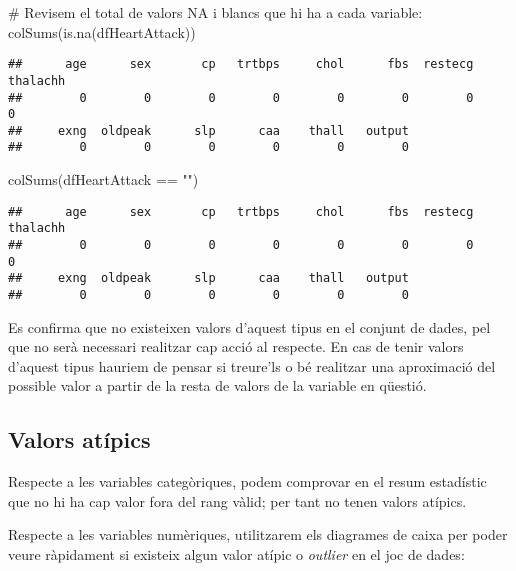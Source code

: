 \documentclass[
]{article}
\newenvironment{Shaded}{\begin{snugshade}}{\end{snugshade}}
\newcommand{\CommentTok}[1]{\textcolor[rgb]{0.50,0.62,0.50}{#1}}
\newcommand{\FunctionTok}[1]{\textcolor[rgb]{0.94,0.94,0.56}{#1}}
\newcommand{\NormalTok}[1]{\textcolor[rgb]{0.80,0.80,0.80}{#1}}
\newcommand{\SpecialCharTok}[1]{\textcolor[rgb]{0.86,0.64,0.64}{#1}}
\newcommand{\StringTok}[1]{\textcolor[rgb]{0.80,0.58,0.58}{#1}}
\begin{document}
\begin{Shaded}
\begin{Highlighting}[]
\CommentTok{\# Revisem el total de valors NA i blancs que hi ha a cada variable:}
\FunctionTok{colSums}\NormalTok{(}\FunctionTok{is.na}\NormalTok{(dfHeartAttack))}
\end{Highlighting}
\end{Shaded}

\begin{verbatim}
##      age      sex       cp   trtbps     chol      fbs  restecg thalachh 
##        0        0        0        0        0        0        0        0 
##     exng  oldpeak      slp      caa    thall   output 
##        0        0        0        0        0        0
\end{verbatim}

\begin{Shaded}
\begin{Highlighting}[]
\FunctionTok{colSums}\NormalTok{(dfHeartAttack }\SpecialCharTok{==} \StringTok{""}\NormalTok{)}
\end{Highlighting}
\end{Shaded}

\begin{verbatim}
##      age      sex       cp   trtbps     chol      fbs  restecg thalachh 
##        0        0        0        0        0        0        0        0 
##     exng  oldpeak      slp      caa    thall   output 
##        0        0        0        0        0        0
\end{verbatim}

Es confirma que no existeixen valors d'aquest tipus en el conjunt de
dades, pel que no serà necessari realitzar cap acció al respecte. En cas
de tenir valors d'aquest tipus hauriem de pensar si treure'ls o bé
realitzar una aproximació del possible valor a partir de la resta de
valors de la variable en qüestió.

\hypertarget{valors-atuxedpics}{%
\subsection{Valors atípics}\label{valors-atuxedpics}}

Respecte a les variables categòriques, podem comprovar en el resum
estadístic que no hi ha cap valor fora del rang vàlid; per tant no tenen
valors atípics.

Respecte a les variables numèriques, utilitzarem els diagrames de caixa
per poder veure ràpidament si existeix algun valor atípic o
\emph{outlier} en el joc de dades:
\end{document}

